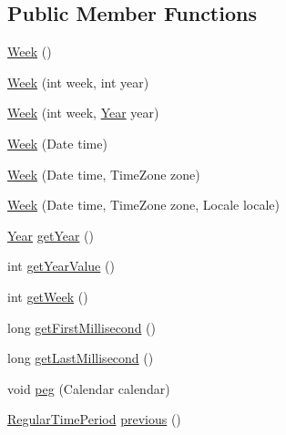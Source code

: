 \subsection*{Public Member Functions}
\begin{DoxyCompactItemize}
\item 
\mbox{\hyperlink{classorg_1_1jfree_1_1data_1_1time_1_1_week_ab333140995d4969e01d472b3cd2fcca5}{Week}} ()
\item 
\mbox{\hyperlink{classorg_1_1jfree_1_1data_1_1time_1_1_week_ae5e3d72098626245e3b59a63717448a4}{Week}} (int week, int year)
\item 
\mbox{\hyperlink{classorg_1_1jfree_1_1data_1_1time_1_1_week_a7f4a22e7f8808dbd9441d8c02baf138c}{Week}} (int week, \mbox{\hyperlink{classorg_1_1jfree_1_1data_1_1time_1_1_year}{Year}} year)
\item 
\mbox{\hyperlink{classorg_1_1jfree_1_1data_1_1time_1_1_week_aa828d1c01356acd1a042e0f8f06519ba}{Week}} (Date time)
\item 
\mbox{\hyperlink{classorg_1_1jfree_1_1data_1_1time_1_1_week_a35ae2d91e07aa5bdb528cf22b2232b84}{Week}} (Date time, Time\+Zone zone)
\item 
\mbox{\hyperlink{classorg_1_1jfree_1_1data_1_1time_1_1_week_aa2e91a61def88a3f75f5bc316ba21272}{Week}} (Date time, Time\+Zone zone, Locale locale)
\item 
\mbox{\hyperlink{classorg_1_1jfree_1_1data_1_1time_1_1_year}{Year}} \mbox{\hyperlink{classorg_1_1jfree_1_1data_1_1time_1_1_week_aa8fe36021f0f4880f6658d19ec6aaeea}{get\+Year}} ()
\item 
int \mbox{\hyperlink{classorg_1_1jfree_1_1data_1_1time_1_1_week_ad22101142151e76f4c8d446528ce2024}{get\+Year\+Value}} ()
\item 
int \mbox{\hyperlink{classorg_1_1jfree_1_1data_1_1time_1_1_week_a6d94c5958bfa4eee1daee417ec285195}{get\+Week}} ()
\item 
long \mbox{\hyperlink{classorg_1_1jfree_1_1data_1_1time_1_1_week_a75fe3256e304fb99a5dc9c75c673b318}{get\+First\+Millisecond}} ()
\item 
long \mbox{\hyperlink{classorg_1_1jfree_1_1data_1_1time_1_1_week_ad26539f6b31019dcb21ec373ff07ed0e}{get\+Last\+Millisecond}} ()
\item 
void \mbox{\hyperlink{classorg_1_1jfree_1_1data_1_1time_1_1_week_ab58b703a2f1d37a0daffef7f6d509122}{peg}} (Calendar calendar)
\item 
\mbox{\hyperlink{classorg_1_1jfree_1_1data_1_1time_1_1_regular_time_period}{Regular\+Time\+Period}} \mbox{\hyperlink{classorg_1_1jfree_1_1data_1_1time_1_1_week_a08358ec4b2cd6b564a349db9e223e3c7}{previous}} ()

\end{DoxyCompactItemize}
